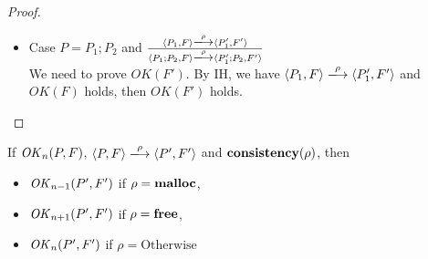 \begin{proof}
\begin{itemize}
    \item Case \( P = P_1;P_2\) and \( \frac{ \langle P_1, F \rangle \xlongrightarrow{\rho} \langle P_1', F' \rangle }
      {\langle P_1;P_2, F \rangle \xlongrightarrow{\rho} \langle P_1';P_2, F' \rangle} \) \\
    We need to prove \(OK(F')\). By IH, we have \( \langle P_1, F
    \rangle \xlongrightarrow{\rho} \langle P_1', F' \rangle \) and \(
    OK(F) \) holds, then \(OK(F')\) holds.
      
      
  \end{itemize}
\end{proof}



\begin{lemma}
\label{lem:okPreserved}
If \(\mathit{OK}_n(P, F)\), \( \langle P, F \rangle \xlongrightarrow{\rho} \langle P', F' \rangle\) and \(\mathbf{consistency}(\rho)\), then
\begin{itemize}
\item \(\mathit{OK}_{n-1}(P', F')\) if \(\rho = \mathbf{malloc}\),
\item \(\mathit{OK}_{n+1}(P', F')\) if \(\rho = \mathbf{free}\),
\item \(\mathit{OK}_n(P', F')\) if \(\rho = \mbox{Otherwise}  \)
\end{itemize}
\end{lemma}


